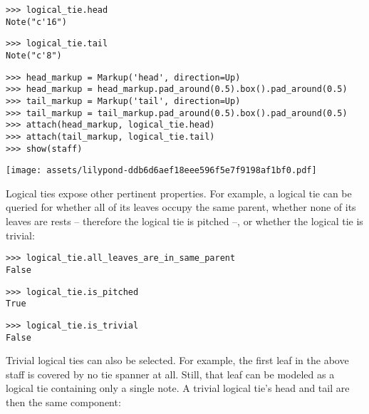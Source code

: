 \begin{abjadbookoutput}
\begin{singlespacing}
\vspace{-0.5\baselineskip}
\begin{lstlisting}
>>> logical_tie.head
Note("c'16")
\end{lstlisting}
\begin{lstlisting}
>>> logical_tie.tail
Note("c'8")
\end{lstlisting}
\begin{lstlisting}
>>> head_markup = Markup('head', direction=Up)
>>> head_markup = head_markup.pad_around(0.5).box().pad_around(0.5)
>>> tail_markup = Markup('tail', direction=Up)
>>> tail_markup = tail_markup.pad_around(0.5).box().pad_around(0.5)
>>> attach(head_markup, logical_tie.head)
>>> attach(tail_markup, logical_tie.tail)
>>> show(staff)
\end{lstlisting}
\noindent\texttt{[image: assets/lilypond-ddb6d6aef18eee596f5e7f9198af1bf0.pdf]}
\end{singlespacing}
\end{abjadbookoutput}

\noindent Logical ties expose other pertinent properties. For example, a
logical tie can be queried for whether all of its leaves occupy the same
parent, whether none of its leaves are rests -- therefore the logical tie is
pitched --, or whether the logical tie is trivial:

\begin{comment}
<abjad>
logical_tie.all_leaves_are_in_same_parent
logical_tie.is_pitched
logical_tie.is_trivial
</abjad>
\end{comment}

\begin{abjadbookoutput}
\begin{singlespacing}
\vspace{-0.5\baselineskip}
\begin{lstlisting}
>>> logical_tie.all_leaves_are_in_same_parent
False
\end{lstlisting}
\begin{lstlisting}
>>> logical_tie.is_pitched
True
\end{lstlisting}
\begin{lstlisting}
>>> logical_tie.is_trivial
False
\end{lstlisting}
\end{singlespacing}
\end{abjadbookoutput}

\noindent Trivial logical ties can also be selected. For example, the first
leaf in the above staff is covered by no tie spanner at all. Still, that leaf
can be modeled as a logical tie containing only a single note. A trivial
logical tie's head and tail are then the same component:

